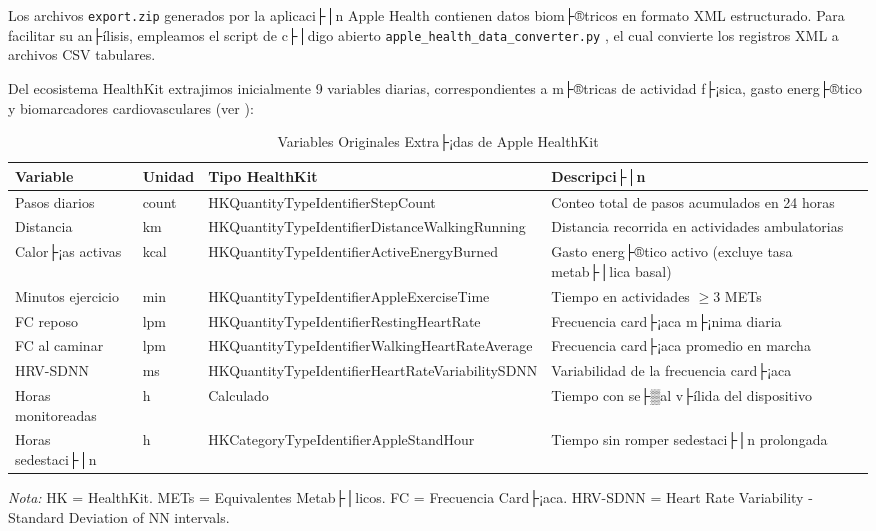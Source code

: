 Los archivos \texttt{export.zip} generados por la aplicaci├│n Apple Health contienen datos biom├®tricos en formato XML estructurado. Para facilitar su an├ílisis, empleamos el script de c├│digo abierto \texttt{apple\_health\_data\_converter.py} \cite{Gaur2024AppleHealth}, el cual convierte los registros XML a archivos CSV tabulares.

Del ecosistema HealthKit extrajimos inicialmente 9 variables diarias, correspondientes a m├®tricas de actividad f├¡sica, gasto energ├®tico y biomarcadores cardiovasculares (ver ):

\begin{table}[htbp]
\centering
\caption{Variables Originales Extra├¡das de Apple HealthKit}
\label{tab:variables_originales_apple_health}
\small
\begin{tabular}{@{}p{3.2cm}p{1.2cm}p{4cm}p{5cm}@{}}
\toprule
\textbf{Variable} & \textbf{Unidad} & \textbf{Tipo HealthKit} & \textbf{Descripci├│n} \\
\midrule
Pasos diarios & count & HKQuantityTypeIdentifier\-StepCount & Conteo total de pasos acumulados en 24 horas \\
Distancia & km & HKQuantityTypeIdentifier\-DistanceWalkingRunning & Distancia recorrida en actividades ambulatorias \\
Calor├¡as activas & kcal & HKQuantityTypeIdentifier\-ActiveEnergyBurned & Gasto energ├®tico activo (excluye tasa metab├│lica basal) \\
Minutos ejercicio & min & HKQuantityTypeIdentifier\-AppleExerciseTime & Tiempo en actividades $\geq$3 METs \\
FC reposo & lpm & HKQuantityTypeIdentifier\-RestingHeartRate & Frecuencia card├¡aca m├¡nima diaria \\
FC al caminar & lpm & HKQuantityTypeIdentifier\-WalkingHeartRateAverage & Frecuencia card├¡aca promedio en marcha \\
HRV-SDNN & ms & HKQuantityTypeIdentifier\-HeartRateVariabilitySDNN & Variabilidad de la frecuencia card├¡aca \\
Horas monitoreadas & h & Calculado & Tiempo con se├▒al v├ílida del dispositivo \\
Horas sedestaci├│n & h & HKCategoryTypeIdentifier\-AppleStandHour & Tiempo sin romper sedestaci├│n prolongada \\
\bottomrule
\end{tabular}
\begin{flushleft}
\scriptsize
\textit{Nota:} HK = HealthKit. METs = Equivalentes Metab├│licos. FC = Frecuencia Card├¡aca. HRV-SDNN = Heart Rate Variability - Standard Deviation of NN intervals.
\end{flushleft}
\end{table}


